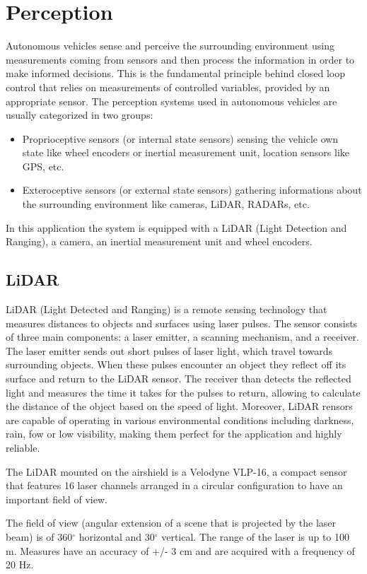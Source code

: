 \documentclass[a4paper,12pt,oneside]{book}
\begin{document}
\section{Perception}
Autonomous vehicles sense and perceive the surrounding environment using measurements coming from sensors and then process the information in order to make informed decisions. 
This is the fundamental principle behind closed loop control that relies on measurements of controlled variables, provided by an appropriate sensor.
The perception systems used in autonomous vehicles are usually categorized in two groups:
\begin{itemize}
    \item Proprioceptive sensors (or internal state sensors) sensing the vehicle own state like wheel encoders or inertial measurement unit, location sensors like GPS, etc.
    \item Exteroceptive sensors (or external state sensors) gathering informations about the surrounding environment like cameras, LiDAR, RADARs, etc.
\end{itemize}
In this application the system is equipped with a LiDAR (Light Detection and Ranging), a camera, an inertial measurement unit and wheel encoders.

\subsection{LiDAR}
LiDAR (Light Detected and Ranging) is a remote sensing technology that measures distances to objects and surfaces using laser pulses. 
The sensor consists of three main components: a laser emitter, a scanning mechanism, and a receiver.
The laser emitter sends out short pulses of laser light, which travel towards surrounding objects. 
When these pulses encounter an object they reflect off its surface and return to the LiDAR sensor.
The receiver than detects the reflected light and measures the time it takes for the pulses to return, allowing to calculate the distance of the object based on the speed of light.
Moreover, LiDAR rensors are capable of operating in various environmental conditions including darkness, rain, fow or low visibility, making them perfect for the application and highly reliable.

The LiDAR mounted on the airshield is a Velodyne VLP-16, a compact sensor that features 16 laser channels arranged in a circular configuration to have an important field of view.

The field of view (angular extension of a scene that is projected by the laser beam) is of 360$^\circ$ horizontal and 30$^\circ$ vertical.
The range of the laser is up to 100 m. 
Measures have an accuracy of +/- 3 cm and are acquired with a frequency of 20 Hz.
\end{document}
